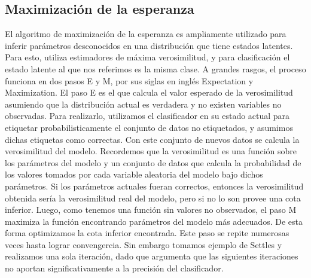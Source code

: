 


\subsection{Maximización de la esperanza}
El algoritmo de maximización de la esperanza es ampliamente utilizado para inferir parámetros desconocidos en una distribución que tiene estados latentes. Para esto, utiliza estimadores de máxima verosimilitud, y para clasificación el estado latente al que nos referimos es la misma clase. A grandes rasgos, el proceso funciona en dos pasos E y M, por sus siglas en inglés Expectation y Maximization.
El paso E es el que calcula el valor esperado de la verosimilitud asumiendo que la distribución actual es verdadera y no existen variables no observadas. Para realizarlo, utilizamos el clasificador en su estado actual para etiquetar probabilisticamente el conjunto de datos no etiquetados, y asumimos dichas etiquetas como correctas. Con este conjunto de nuevos datos se calcula la verosimilitud del modelo.
Recordemos que la verosimilitud es una función sobre los parámetros del modelo y un conjunto de datos que calcula la probabilidad de los valores tomados por cada variable aleatoria del modelo bajo dichos parámetros.
Si los parámetros actuales fueran correctos, entonces la verosimilitud obtenida sería la verosimilitud real del modelo, pero si no lo son provee una cota inferior. Luego, como tenemos una función sin valores no observados, el paso M maximiza la función encontrando parámetros del modelo más adecuados. De esta forma optimizamos la cota inferior encontrada.
Este paso se repite numerosas veces hasta lograr convengercia. Sin embargo tomamos ejemplo de Settles y realizamos una sola iteración, dado que argumenta que las siguientes iteraciones no aportan significativamente a la precisión del clasificador.





